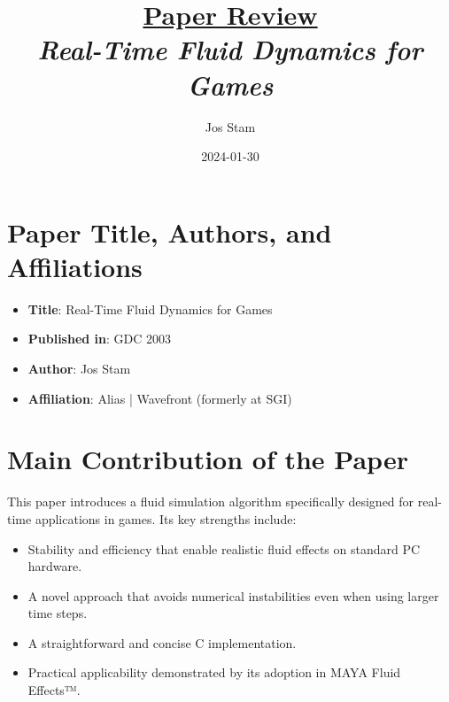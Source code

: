 \documentclass[12pt]{article}
\newcommand{\paperTitle}{
    \textit{\normalsize{Real-Time Fluid Dynamics for Games}}
}
\begin{document}
\title{\Large\uline{\textbf{Paper Review}} \\[0.4em]
\paperTitle{} 
}
\author{Jos Stam}
\date{2024-01-30}

\maketitle

\section{Paper Title, Authors, and Affiliations}
\begin{itemize}[noitemsep]
    \item \textbf{Title}: Real-Time Fluid Dynamics for Games
    \item \textbf{Published in}: GDC 2003
    \item \textbf{Author}: Jos Stam
    \item \textbf{Affiliation}: Alias | Wavefront (formerly at SGI)
\end{itemize}

\section{Main Contribution of the Paper}
This paper introduces a fluid simulation algorithm specifically designed for real-time applications in games. Its key strengths include:
\begin{itemize}[noitemsep]
    \item Stability and efficiency that enable realistic fluid effects on standard PC hardware.
    \item A novel approach that avoids numerical instabilities even when using larger time steps.
    \item A straightforward and concise C implementation.
    \item Practical applicability demonstrated by its adoption in MAYA Fluid Effects™.
\end{itemize}
\end{document}
